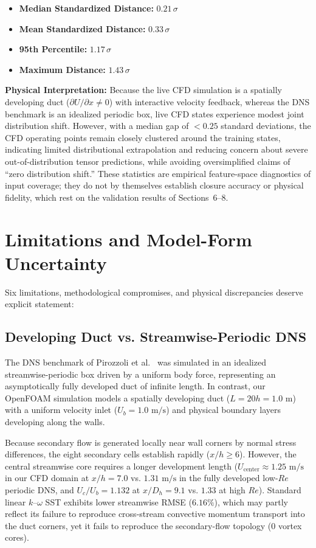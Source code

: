 \documentclass[11pt,a4paper]{article}
\begin{document}
\begin{itemize}
    \item \textbf{Median Standardized Distance:} $0.21\,\sigma$
    \item \textbf{Mean Standardized Distance:} $0.33\,\sigma$
    \item \textbf{95th Percentile:} $1.17\,\sigma$
    \item \textbf{Maximum Distance:} $1.43\,\sigma$
\end{itemize}

\textbf{Physical Interpretation:} Because the live CFD simulation is a spatially developing duct ($\partial U/\partial x \ne 0$) with interactive velocity feedback, whereas the DNS benchmark is an idealized periodic box, live CFD states experience modest joint distribution shift. However, with a median gap of $< 0.25$ standard deviations, the CFD operating points remain closely clustered around the training states, indicating limited distributional extrapolation and reducing concern about severe out-of-distribution tensor predictions, while avoiding oversimplified claims of ``zero distribution shift.'' These statistics are empirical feature-space diagnostics of input coverage; they do not by themselves establish closure accuracy or physical fidelity, which rest on the validation results of Sections~6--8.

\section{Limitations and Model-Form Uncertainty}
\label{sec:limitations}

Six limitations, methodological compromises, and physical discrepancies deserve explicit statement:

\subsection{Developing Duct vs. Streamwise-Periodic DNS}
The DNS benchmark of Pirozzoli et al.~\cite{pirozzoli2018turbulence} was simulated in an idealized streamwise-periodic box driven by a uniform body force, representing an asymptotically fully developed duct of infinite length. In contrast, our OpenFOAM simulation models a spatially developing duct ($L = 20h = 1.0\text{ m}$) with a uniform velocity inlet ($U_b = 1.0\text{ m/s}$) and physical boundary layers developing along the walls.

Because secondary flow is generated locally near wall corners by normal stress differences, the eight secondary cells establish rapidly ($x/h \ge 6$). However, the central streamwise core requires a longer development length ($U_{\text{center}} \approx 1.25\text{ m/s}$ in our CFD domain at $x/h=7.0$ vs. $1.31\text{ m/s}$ in the fully developed low-$Re$ periodic DNS, and $U_c/U_b = 1.132$ at $x/D_h = 9.1$ vs. $1.33$ at high $Re$). Standard linear $k\text{--}\omega$ SST exhibits lower streamwise RMSE ($6.16\%$), which may partly reflect its failure to reproduce cross-stream convective momentum transport into the duct corners, yet it fails to reproduce the secondary-flow topology ($0$ vortex cores).
\end{document}
